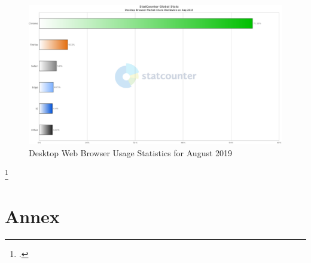 \newpage

\begin{figure}[hbt]
	\centering
	\includegraphics[scale=0.48, keepaspectratio, angle=90]{pics/StatCounter-browser-ww-monthly-201908-201908-bar_desktop.eps}
	\caption[Desktop Web Browser Usage Statistics for August 2019]{Desktop Web Browser Usage Statistics for August 2019\footnotemark}
	\label{fig:stats-desktop}
\end{figure}
\footcitetext[Source][]{statcounter-desktop}

\chapter{Annex}


